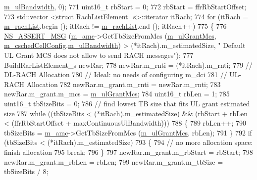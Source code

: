 \begin{DoxyCode}
      \hyperlink{structns3_1_1FfMacCschedSapProvider_1_1CschedCellConfigReqParameters_a5ab5b102878e6e7e7727a14af4a64d2f}{m\_ulBandwidth}, 0);
771   uint16\_t rbStart = 0;
772   rbStart = ffrRbStartOffset;
773   std::vector <struct RachListElement\_s>::iterator itRach;
774   \textcolor{keywordflow}{for} (itRach = \hyperlink{classns3_1_1FdTbfqFfMacScheduler_a0d2d08dad69997d048c8d35b5dac76e7}{m\_rachList}.begin (); itRach != \hyperlink{classns3_1_1FdTbfqFfMacScheduler_a0d2d08dad69997d048c8d35b5dac76e7}{m\_rachList}.end (); itRach++)
775     \{
776       \hyperlink{assert_8h_aff5ece9066c74e681e74999856f08539}{NS\_ASSERT\_MSG} (\hyperlink{classns3_1_1FdTbfqFfMacScheduler_a53e0bcb714cd32ee639f7b4e7265087c}{m\_amc}->GetTbSizeFromMcs (\hyperlink{classns3_1_1FdTbfqFfMacScheduler_ab528c9593f9398be49667dd8f7864488}{m\_ulGrantMcs}, 
      \hyperlink{classns3_1_1FdTbfqFfMacScheduler_a73d5d866713fa06e1cc6186b0f556693}{m\_cschedCellConfig}.\hyperlink{structns3_1_1FfMacCschedSapProvider_1_1CschedCellConfigReqParameters_a5ab5b102878e6e7e7727a14af4a64d2f}{m\_ulBandwidth}) > (*itRach).m\_estimatedSize, \textcolor{stringliteral}{" Default UL
       Grant MCS does not allow to send RACH messages"});
777       BuildRarListElement\_s newRar;
778       newRar.m\_rnti = (*itRach).m\_rnti;
779       \textcolor{comment}{// DL-RACH Allocation}
780       \textcolor{comment}{// Ideal: no needs of configuring m\_dci}
781       \textcolor{comment}{// UL-RACH Allocation}
782       newRar.m\_grant.m\_rnti = newRar.m\_rnti;
783       newRar.m\_grant.m\_mcs = \hyperlink{classns3_1_1FdTbfqFfMacScheduler_ab528c9593f9398be49667dd8f7864488}{m\_ulGrantMcs};
784       uint16\_t rbLen = 1;
785       uint16\_t tbSizeBits = 0;
786       \textcolor{comment}{// find lowest TB size that fits UL grant estimated size}
787       \textcolor{keywordflow}{while} ((tbSizeBits < (*itRach).m\_estimatedSize) && (rbStart + rbLen < (ffrRbStartOffset + 
      maxContinuousUlBandwidth)))
788         \{
789           rbLen++;
790           tbSizeBits = \hyperlink{classns3_1_1FdTbfqFfMacScheduler_a53e0bcb714cd32ee639f7b4e7265087c}{m\_amc}->GetTbSizeFromMcs (\hyperlink{classns3_1_1FdTbfqFfMacScheduler_ab528c9593f9398be49667dd8f7864488}{m\_ulGrantMcs}, rbLen);
791         \}
792       \textcolor{keywordflow}{if} (tbSizeBits < (*itRach).m\_estimatedSize)
793         \{
794           \textcolor{comment}{// no more allocation space: finish allocation}
795           \textcolor{keywordflow}{break};
796         \}
797       newRar.m\_grant.m\_rbStart = rbStart;
798       newRar.m\_grant.m\_rbLen = rbLen;
799       newRar.m\_grant.m\_tbSize = tbSizeBits / 8;

\end{DoxyCode}
